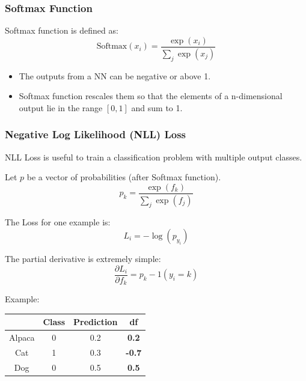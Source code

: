 \documentclass[aspectratio=169, 10pt]{beamer}
\begin{document}
\begin{frame}
    \frametitle{Softmax Function}
    Softmax function is defined as:
    \[
        \text{Softmax}(x_i) = \frac{\exp(x_i)}{ \sum_j \exp(x_j)}
    \]

    \begin{itemize}
        \item The outputs from a NN can be negative or above 1.
        \item Softmax function rescales them so that the elements of a n-dimensional output lie in the range $[0, 1]$ and sum to 1.
    \end{itemize}
        
\end{frame}

\begin{frame}
    \frametitle{Negative Log Likelihood (NLL) Loss}

    NLL Loss is useful to train a classification problem with multiple output classes.\break

    Let $p$ be a vector of probabilities (after Softmax function). 
    \[
        p_k = \frac{\exp(f_k)}{\sum_j \exp(f_j)}
    \]

    The Loss for one example is:
    \[
        L_i = - \log(p_{y_i})
    \]

    The partial derivative is extremely simple:
    \[
        \frac{\partial L_i}{\partial f_k} = p_k - 1(y_i = k)
    \]

    Example:
    \begin{table}[]
        \begin{tabular}{ccc|c}
         & \textbf{Class} & \textbf{Prediction} & \textbf{df} \\ \hline
        Alpaca & 0 & 0.2 & \textbf{0.2} \\
        Cat & 1 & 0.3 & \textbf{-0.7} \\
        Dog & 0 & 0.5 & \textbf{0.5} \\       
        \end{tabular}
    \end{table}
        
\end{frame}

\end{document}
